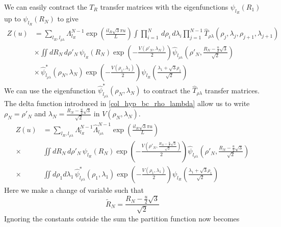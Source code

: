 %
We can easily contract the $T_R$ transfer matrices with the eigenfunctions $\psi_{l_R}\left(R_{1}\right)$ up to $\psi_{l_R}\left(R_{N}\right)$ to give
%
\begin{align}\label{col_hyp_part_2}
Z \left(u\right)&=\sum_{l_R,l_{\rho\lambda}}\Lambda_{l_{R}}^{N-1}\exp\left(\frac{il_{R}\sqrt{3}\pi u}{L}\right)\int\prod^{N}_{i=1}\,d\rho_i\,d\lambda_i\prod^{N-1}_{j=1}\hat{T}_{\rho\lambda}(\rho_j,\lambda_j,\rho_{j+1},\lambda_{j+1})\nonumber\\
&\times\iint dR_N\,d\rho'_N\,\psi_{l_R}\left(R_{N}\right)\exp\left(-\frac{V\left(\rho'_{N},\lambda_N\right)}{2}\right)\hat{\psi}_{l_{\rho\lambda}}\left(\rho'_{N},\frac{R_N-\frac{u}{2}\sqrt{3}}{\sqrt{2}}\right)\nonumber\\
&\times\,\hat{\psi}^{*}_{l_{\rho\lambda}}\left(\rho_{N},\lambda_{N}\right)\exp\left(-\frac{V\left(\rho_{1},\lambda_{1}\right)}{2}\right)\psi_{l_R}\left(\frac{\lambda_1 + \sqrt{3}\rho_1}{\sqrt{2}}\right)
\end{align}
%
We can use the eigenfunction $\hat{\psi}^{*}_{l_{\rho\lambda}}\left(\rho_{N},\lambda_{N}\right)$ to contract the $\hat{T}_{\rho\lambda}$ transfer matrices. The delta function introduced in \eqref{col_hyp_bc_rho_lambda} allow us to write $\rho_{N}=\rho'_{N}$ and $\lambda_{N}=\frac{R_N-\frac{u}{2}\sqrt{3}}{\sqrt{2}}$ in $V(\rho_{N},\lambda_{N})$.
%
\begin{equation}\label{col_hyp_part_3}
\begin{split}
Z\left(u\right)&=\sum_{l_R,l_{\rho\lambda}}\Lambda_{l_{R}}^{N-1}\hat{\Lambda}_{l_{\rho\lambda}}^{N-1}\exp\left(\frac{il_R\sqrt{3}\pi u}{L}\right)\\
\times&\iint dR_N\,d\rho'_N\,\psi_{l_R}\left(R_{N}\right)\exp\left(-\frac{V\left(\rho'_{N},\frac{R_N-\frac{u}{2}\sqrt{3}}{\sqrt{2}}\right)}{2}\right)\hat{\psi}_{l_{\rho\lambda}}\left(\rho'_{N},\frac{R_N-\frac{u}{2}\sqrt{3}}{\sqrt{2}}\right)\\
\times&\iint d\rho_1d\lambda_1\,\hat{\psi}^{*}_{l_{\rho\lambda}}\left(\rho_{1},\lambda_{1}\right)\exp\left(-\frac{V\left(\rho_{1},\lambda_{1}\right)}{2}\right)\psi_{l_R}\left(\frac{\lambda_1 + \sqrt{3}\rho_1}{\sqrt{2}}\right)
\end{split}
\end{equation}
%
Here we make a change of variable such that
%
\begin{equation}\label{variable_change}
\tilde{R}_{N}=\frac{R_N-\frac{u}{2}\sqrt{3}}{\sqrt{2}}
\end{equation}
%
Ignoring the constants outside the sum the partition function now becomes
